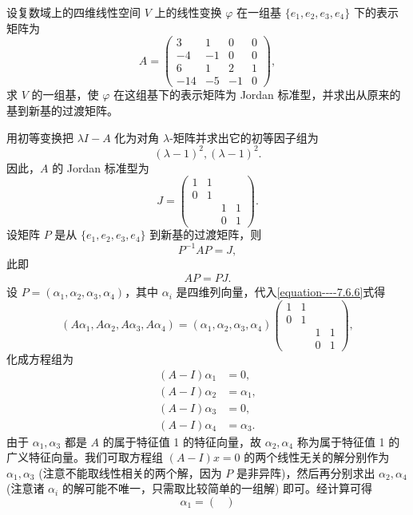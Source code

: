 \documentclass[../../main.tex]{subfiles}%
\begin{document}
\begin{example}
设复数域上的四维线性空间 $V$ 上的线性变换 $\varphi$ 在一组基 $\{e_1,e_2,e_3,e_4\}$ 下的表示矩阵为
\[
A = \begin{pmatrix}
3 & 1 & 0 & 0 \\
-4 & -1 & 0 & 0 \\
6 & 1 & 2 & 1 \\
-14 & -5 & -1 & 0
\end{pmatrix},
\]
求 $V$ 的一组基，使 $\varphi$ 在这组基下的表示矩阵为 Jordan 标准型，并求出从原来的基到新基的过渡矩阵。
\end{example}
\begin{solution}

用初等变换把 $\lambda I - A$ 化为对角 $\lambda$-矩阵并求出它的初等因子组为
\[
(\lambda - 1)^2, (\lambda - 1)^2.
\]
因此，$A$ 的 Jordan 标准型为
\[
J = \begin{pmatrix}
1 & 1 & & \\
0 & 1 & & \\
& & 1 & 1 \\
& & 0 & 1
\end{pmatrix}.
\]
设矩阵 $P$ 是从 $\{e_1,e_2,e_3,e_4\}$ 到新基的过渡矩阵，则
\[
P^{-1}AP = J,
\]
此即
\begin{align}
AP = PJ.\label{equation----7.6.6}
\end{align}
设 $P = (\alpha_1,\alpha_2,\alpha_3,\alpha_4)$，其中 $\alpha_i$ 是四维列向量，代入\eqref{equation----7.6.6}式得
\[
(A\alpha_1,A\alpha_2,A\alpha_3,A\alpha_4) = (\alpha_1,\alpha_2,\alpha_3,\alpha_4)\begin{pmatrix}
1 & 1 & & \\
0 & 1 & & \\
& & 1 & 1 \\
& & 0 & 1
\end{pmatrix},
\]
化成方程组为
\begin{align*}
(A - I)\alpha_1 &= 0,\\
(A - I)\alpha_2 &= \alpha_1,\\
(A - I)\alpha_3 &= 0,\\
(A - I)\alpha_4 &= \alpha_3.
\end{align*}
由于 $\alpha_1,\alpha_3$ 都是 $A$ 的属于特征值 1 的特征向量，故 $\alpha_2,\alpha_4$ 称为属于特征值 1 的广义特征向量。我们可取方程组 $(A - I)x = 0$ 的两个线性无关的解分别作为 $\alpha_1,\alpha_3$ (注意不能取线性相关的两个解，因为 $P$ 是非异阵)，然后再分别求出 $\alpha_2,\alpha_4$ (注意诸 $\alpha_i$ 的解可能不唯一，只需取比较简单的一组解) 即可。经计算可得
\[
\alpha_1 = \begin{pmatrix}

\end{pmatrix}\]
\end{solution}
\end{document}
